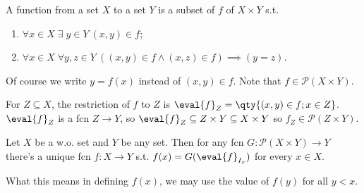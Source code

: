 \begin{note}
    A function from a set $X$ to a set $Y$ is a subset of $f$ of $X \times Y$ s.t.
    \begin{enumerate}
        \item $\forall x \in X \; \exists \; y \in Y \ (x, y) \in f$;
        \item $\forall x \in X \; \forall y, z \in Y \ ((x, y) \in f \wedge (x, z) \in f) \implies (y = z)$.
    \end{enumerate}

    Of course we write $y = f(x)$ instead of $(x, y) \in f$.
    Note that $f \in \mathcal{P}(X \times Y)$.

    For $Z \subseteq X$, the restriction of $f$ to $Z$ is $\eval{f}_Z = \qty{(x, y) \in f ; x \in Z}$.
    $\eval{f}_Z$ is a fcn $Z \to Y$, so $\eval{f}_Z \subseteq Z \times Y \subseteq X \times Y$ so $f_Z \in \mathcal{P}(Z \times Y)$.
\end{note}

\begin{theorem}
    Let $X$ be a w.o. set and $Y$ be any set.
    Then for any fcn $G \colon \mathcal{P}(X \times Y) \to Y$ there's a unique fcn $f : X \to Y$ s.t. $f(x) = G(\eval{f}_{I_x})$ for every $x \in X$.
\end{theorem}

\begin{remark}
    What this means in defining $f(x)$, we may use the value of $f(y)$ for all $y < x$.
\end{remark}

